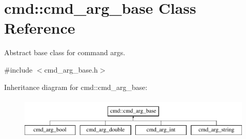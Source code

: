 \hypertarget{classcmd_1_1cmd__arg__base}{\section{cmd\-:\-:cmd\-\_\-arg\-\_\-base Class Reference}
\label{classcmd_1_1cmd__arg__base}
}


Abstract base class for command args.  




{\ttfamily \#include $<$cmd\-\_\-arg\-\_\-base.\-h$>$}

Inheritance diagram for cmd\-:\-:cmd\-\_\-arg\-\_\-base\-:\begin{figure}[H]
\begin{center}
\leavevmode
\includegraphics[height=2.000000cm]{classcmd_1_1cmd__arg__base}
\end{center}
\end{figure}
